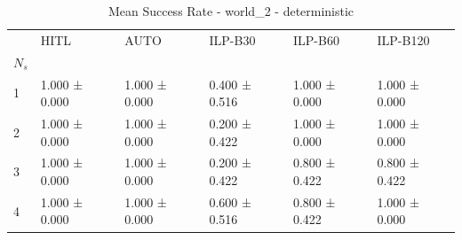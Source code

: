 \begin{table}
\caption{Mean Success Rate - world_2 - deterministic}
\label{tab:success_rate_deterministic}
\begin{tabular}{llllll}
\toprule
 & HITL & AUTO & ILP-B30 & ILP-B60 & ILP-B120 \\
$N_s$ &  &  &  &  &  \\
\midrule
1 & 1.000 ± 0.000 & 1.000 ± 0.000 & 0.400 ± 0.516 & 1.000 ± 0.000 & 1.000 ± 0.000 \\
2 & 1.000 ± 0.000 & 1.000 ± 0.000 & 0.200 ± 0.422 & 1.000 ± 0.000 & 1.000 ± 0.000 \\
3 & 1.000 ± 0.000 & 1.000 ± 0.000 & 0.200 ± 0.422 & 0.800 ± 0.422 & 0.800 ± 0.422 \\
4 & 1.000 ± 0.000 & 1.000 ± 0.000 & 0.600 ± 0.516 & 0.800 ± 0.422 & 1.000 ± 0.000 \\
\bottomrule
\end{tabular}
\end{table}
